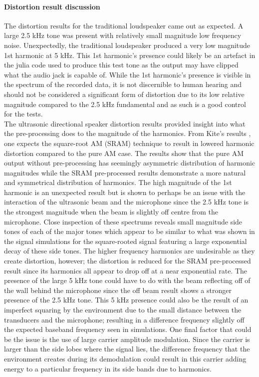 \paragraph{Distortion result discussion}
The distortion results for the traditional loudspeaker came out as expected. A large 2.5 kHz tone was present with relatively small magnitude low frequency noise. Unexpectedly, the traditional loudspeaker produced a very low magnitude 1st harmonic at 5 kHz. This 1st harmonic's presence could likely be an artefact in the julia code used to produce this test tone as the output may have clipped what the audio jack is capable of. While the 1st harmonic's presence is visible in the spectrum of the recorded data, it is not discernible to human hearing and should not be considered a significant form of distortion due to its low relative magnitude compared to the 2.5 kHz fundamental and as such is a good control for the tests.\\
The ultrasonic directional speaker distortion results provided insight into what the pre-processing does to the magnitude of the harmonics. From Kite's results \cite{kite_post_hamilton_1998}, one expects the square-root AM (SRAM) technique to result in lowered harmonic distortion compared to the pure AM case. The results show that the pure AM output without pre-processing has seemingly asymmetric distribution of harmonic magnitudes while the SRAM pre-processed results demonstrate a more natural and symmetrical distribution of harmonics. The high magnitude of the 1st harmonic is an unexpected result but is shown to perhaps be an issue with the interaction of the ultrasonic beam and the microphone since the 2.5 kHz tone is the strongest magnitude when the beam is slightly off centre from the microphone. Close inspection of these spectrums reveals small magnitude side tones of each of the major tones which appear to be similar to what was shown in the signal simulations for the square-rooted signal featuring a large exponential decay of these side tones. The higher frequency harmonics are undesirable as they create distortion, however; the distortion is reduced for the SRAM pre-processed result since its harmonics all appear to drop off at a near exponential rate. The presence of the large 5 kHz tone could have to do with the beam reflecting off of the wall behind the microphone since the off beam result shows a stronger presence of the 2.5 kHz tone. This 5 kHz presence could also be the result of an imperfect squaring by the environment due to the small distance between the transducers and the microphone; resulting in a difference frequency slightly off the expected baseband frequency seen in simulations. One final factor that could be the issue is the use of large carrier amplitude modulation. Since the carrier is larger than the side lobes where the signal lies, the difference frequency that the environment creates during its demodulation could result in this carrier adding energy to a particular frequency in its side bands due to harmonics.\\
